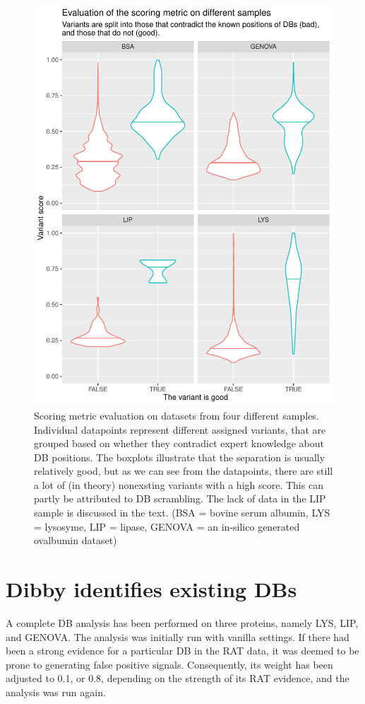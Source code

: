 \begin{figure}
  \centering
  \includegraphics[width=0.85\linewidth]{img/scoring-metric-evaluation.pdf}
  \caption{Scoring metric evaluation on datasets from four different samples. Individual datapoints represent different assigned variants, that are grouped based on whether they contradict expert knowledge about DB positions. The boxplots illustrate that the separation is usually relatively good, but as we can see from the datapoints, there are still a lot of (in theory) nonexsting variants with a high score. This can partly be attributed to DB scrambling. The lack of data in the LIP sample is discussed in the text. (BSA = bovine serum albumin, LYS = lysosyme, LIP = lipase, GENOVA = an in-silico generated ovalbumin dataset)}\label{fig:scoring-metric}
\end{figure}

\section{Dibby identifies existing DBs}

A complete DB analysis has been performed on three proteins, namely LYS, LIP, and GENOVA\@. The analysis was initially run with vanilla settings. If there had been a strong evidence for a particular DB in the RAT data, it was deemed to be prone to generating false positive signals. Consequently, its weight has been adjusted to 0.1, or 0.8, depending on the strength of its RAT evidence, and the analysis was run again.

